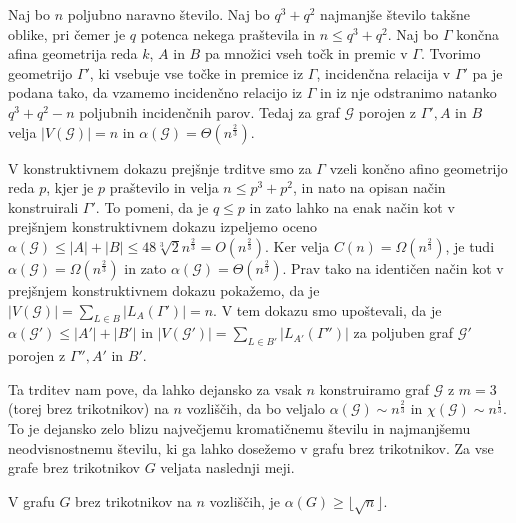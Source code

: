 \documentclass[mat1, tisk]{fmfdelo}
\begin{document}
    \begin{trditev}
        Naj bo $n$ poljubno naravno število. Naj bo $q^3 + q^2$ najmanjše število takšne oblike, pri čemer je $q$ potenca nekega praštevila in $n \leq q^3 + q^2$. Naj bo $\Gamma$ končna afina geometrija reda $k$, $A$ in $B$ pa množici vseh točk in premic v $\Gamma$. Tvorimo geometrijo $\Gamma'$,
        ki vsebuje vse točke in premice iz $\Gamma$, incidenčna relacija v $\Gamma'$ pa je podana tako, da vzamemo incidenčno relacijo iz $\Gamma$ in iz nje odstranimo natanko $q^3 + q^2 - n$ poljubnih incidenčnih parov. Tedaj za graf $\mathcal{G}$ porojen z $\Gamma', A$ in $B$ velja $|V(\mathcal{G})| = n$ in $\alpha(\mathcal{G}) = \Theta(n^{\frac{2}{3}})$. 
    \end{trditev}

    \begin{dokaz}
        V konstruktivnem dokazu prejšnje trditve smo za $\Gamma$ vzeli končno afino geometrijo reda $p$, kjer je $p$ praštevilo in velja $n \leq p^3 + p^2$, in nato na opisan način konstruirali $\Gamma'$. To pomeni, da je $q \leq p$ in zato lahko na enak način kot v prejšnjem konstruktivnem dokazu izpeljemo oceno $\alpha(\mathcal{G}) \leq |A| + |B| \leq 48\sqrt[3]{2}n^{\frac{2}{3}} = O(n^{\frac{2}{3}})$. 
        Ker velja $C(n) = \Omega(n^{\frac{2}{3}})$, je tudi $\alpha(\mathcal{G}) = \Omega(n^{\frac{2}{3}})$ in zato $\alpha(\mathcal{G}) = \Theta(n^{\frac{2}{3}})$. Prav tako na identičen način kot v prejšnjem konstruktivnem dokazu pokažemo, da je $|V(\mathcal{G})| = \sum_{L \in B}|L_A(\Gamma')| = n$. V tem dokazu smo upoštevali, da je $\alpha(\mathcal{G'}) \leq |A'| + |B'|$
        in $|V(\mathcal{G'})| = \sum_{L \in B'}|L_{A'}(\Gamma'')|$ za poljuben graf $\mathcal{G'}$ porojen z $\Gamma'', A'$ in $B'$.
    \end{dokaz}

Ta trditev nam pove, da lahko dejansko za vsak $n$ konstruiramo graf $\mathcal{G}$ z $m = 3$ (torej brez trikotnikov) na $n$ vozliščih, da bo veljalo $\alpha(\mathcal{G}) \sim n^{\frac{2}{3}}$ in $\chi(\mathcal{G}) \sim n^{\frac{1}{3}}$. To je dejansko zelo blizu največjemu kromatičnemu številu in najmanjšemu neodvisnostnemu številu, 
ki ga lahko dosežemo v grafu brez trikotnikov. Za vse grafe brez trikotnikov $G$ veljata naslednji meji.

    \begin{trditev}
        V grafu $G$ brez trikotnikov na $n$ vozliščih, je $\alpha(G) \geq \lfloor\sqrt{n}\rfloor$.
    \end{trditev}
\end{document}

